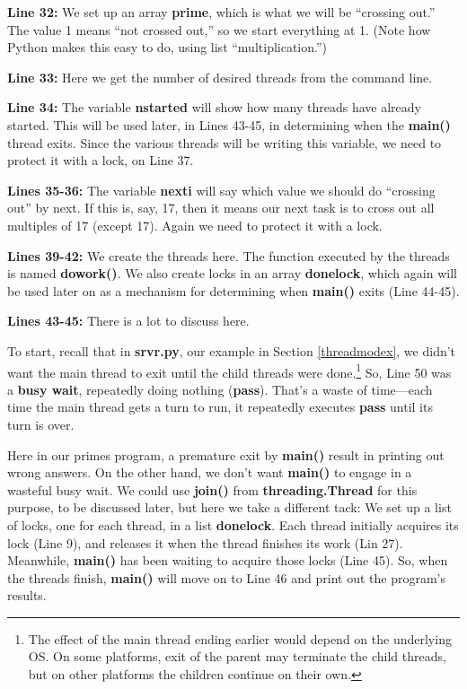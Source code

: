 {\bf Line 32:}  We set up an array {\bf prime}, which is what we will be
``crossing out.''  The value 1 means ``not crossed out,'' so we start
everything at 1.  (Note how Python makes this easy to do, using list
``multiplication.'')

{\bf Line 33:}  Here we get the number of desired threads from the
command line.

{\bf Line 34:}  The variable {\bf nstarted} will show how many threads
have already started.  This will be used later, in Lines 43-45, in
determining when the {\bf main()} thread exits.  Since the various
threads will be writing this variable, we need to protect it with a
lock, on Line 37.

{\bf Lines 35-36:}  The variable {\bf nexti} will say which value we
should do ``crossing out'' by next.  If this is, say, 17, then it means
our next task is to cross out all multiples of 17 (except 17).  Again we
need to protect it with a lock.

{\bf Lines 39-42:}  We create the threads here.  The function executed
by the threads is named {\bf dowork()}.  We also create locks in an
array {\bf donelock}, which again will be used later on as a mechanism
for determining when {\bf main()} exits (Line 44-45).

{\bf Lines 43-45:}  There is a lot to discuss here.  

To start, recall that in {\bf srvr.py}, our example in Section
\ref{threadmodex}, we didn't want the main thread to exit until the
child threads were done.\footnote{The effect of the main thread ending
earlier would depend on the underlying OS.  On some platforms, exit of
the parent may terminate the child threads, but on other platforms the
children continue on their own.}  So, Line 50 was a {\bf busy wait},
repeatedly doing nothing ({\bf pass}).  That's a waste of time---each
time the main thread gets a turn to run, it repeatedly executes {\bf
pass} until its turn is over.

Here in our primes program, a premature exit by {\bf main()} result in
printing out wrong answers.  On the other hand, we don't want {\bf
main()} to engage in a wasteful busy wait.  We could use {\bf join()} 
from {\bf threading.Thread} for this purpose, to be discussed later, but
here we take a different tack:  We set up a list of locks, one for each
thread, in a list {\bf donelock}.  Each thread initially acquires its
lock (Line 9), and releases it when the thread finishes its work (Lin
27).  Meanwhile, {\bf main()} has been waiting to acquire those locks
(Line 45).  So, when the threads finish, {\bf main()} will move on to
Line 46 and print out the program's results.

